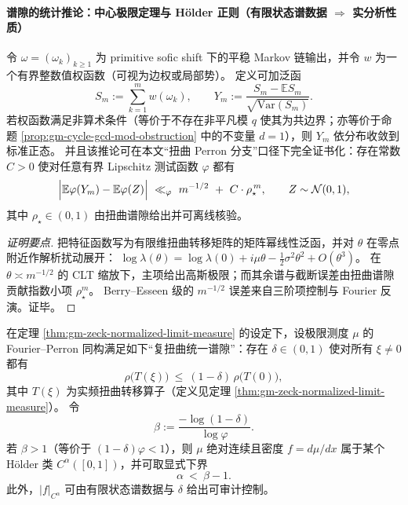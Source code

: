 \paragraph{谱隙的统计推论：中心极限定理与 Hölder 正则（有限状态谱数据 \texorpdfstring{$\Rightarrow$}{=>} 实分析性质）}
\begin{theorem}\label{thm:gm-sofic-spectral-clt}
令 \(\omega=(\omega_k)_{k\ge 1}\) 为 primitive sofic shift 下的平稳 Markov 链输出，并令 \(w\) 为一个有界整数值权函数（可视为边权或局部势）。
定义可加泛函
\[
S_m:=\sum_{k=1}^{m} w(\omega_k),
\qquad
Y_m:=\frac{S_m-\mathbb{E}S_m}{\sqrt{\mathrm{Var}(S_m)}}.
\]
若权函数满足非算术条件（等价于不存在非平凡模 \(q\) 使其为共边界；亦等价于命题 \ref{prop:gm-cycle-gcd-mod-obstruction} 中的不变量 \(d=1\)），则 \(Y_m\) 依分布收敛到标准正态。
并且该推论可在本文“扭曲 Perron 分支”口径下完全证书化：存在常数 \(C>0\) 使对任意有界 Lipschitz 测试函数 \(\varphi\) 都有
\[
\Bigl|\mathbb{E}\varphi(Y_m)-\mathbb{E}\varphi(Z)\Bigr|
\ \ll_{\varphi}\ m^{-1/2}\ +\ C\cdot \rho_\star^{\,m},
\qquad Z\sim\mathcal{N}(0,1),
\]
其中 \(\rho_\star\in(0,1)\) 由扭曲谱隙给出并可离线核验。
\end{theorem}

\begin{proof}[证明要点]
把特征函数写为有限维扭曲转移矩阵的矩阵幂线性泛函，并对 \(\theta\) 在零点附近作解析扰动展开：
\(\log\lambda(\theta)=\log\lambda(0)+i\mu\theta-\tfrac12\sigma^2\theta^2+O(\theta^3)\)。
在 \(\theta\asymp m^{-1/2}\) 的 CLT 缩放下，主项给出高斯极限；而其余谱与截断误差由扭曲谱隙贡献指数小项 \(\rho_\star^m\)。
Berry--Esseen 级的 \(m^{-1/2}\) 误差来自三阶项控制与 Fourier 反演。证毕。
\end{proof}

\begin{theorem}\label{thm:gm-holder-regularity-from-gap}
在定理 \ref{thm:gm-zeck-normalized-limit-measure} 的设定下，设极限测度 \(\mu\) 的 Fourier--Perron 同构满足如下“复扭曲统一谱隙”：存在 \(\delta\in(0,1)\) 使对所有 \(\xi\ne 0\) 都有
\[
\rho\!\bigl(T(\xi)\bigr)\ \le\ (1-\delta)\,\rho\!\bigl(T(0)\bigr),
\]
其中 \(T(\xi)\) 为实频扭曲转移算子（定义见定理 \ref{thm:gm-zeck-normalized-limit-measure}）。
令
\[
\beta:=\frac{-\log(1-\delta)}{\log\varphi}.
\]
若 \(\beta>1\)（等价于 \((1-\delta)\varphi<1\)），则 \(\mu\) 绝对连续且密度 \(f=d\mu/dx\) 属于某个 Hölder 类 \(C^\alpha([0,1])\)，并可取显式下界
\[
\alpha\ <\ \beta-1.
\]
此外，\(|f|_{C^\alpha}\) 可由有限状态谱数据与 \(\delta\) 给出可审计控制。
\end{theorem}

